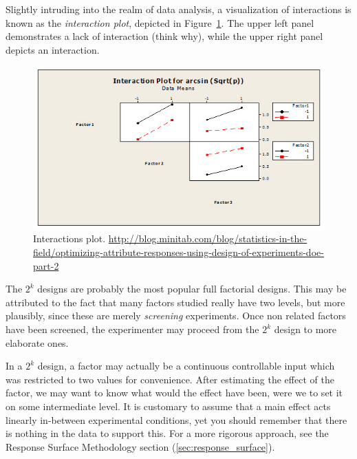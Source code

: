 
Slightly intruding into the realm of data analysis, a visualization of interactions is known as the \emph{interaction plot}, depicted in Figure~\ref{fig:interaction_plot}. 
The upper left panel demonstrates a lack of interaction (think why), while the upper right panel depicts an interaction.
\begin{figure}[ht]
\centering
\includegraphics[width=0.3\textheight]{art/attribute_doe_interaction_plot}
\caption[Interactions plot]{Interactions plot. \newline \url{http://blog.minitab.com/blog/statistics-in-the-field/optimizing-attribute-responses-using-design-of-experiments-doe-part-2}}
\label{fig:interaction_plot}
\end{figure}


\begin{remark}
The $2^k$ designs are probably the most popular full factorial designs. 
This may be attributed to the fact that many factors studied really have two levels, but more plausibly, since these are merely \emph{screening} experiments. 
Once non related factors have been screened, the experimenter may proceed from the $2^k$ design to more elaborate ones. 
\end{remark}



\begin{remark}
In a $2^k$ design, a factor may actually be a continuous controllable input which was restricted to two values for convenience. 
After estimating the effect of the factor, we may want to know what would the effect have been, were we to set it on some intermediate level.
It is customary to assume that a main effect acts linearly in-between experimental conditions, yet you should remember that there is nothing in the data to support this.
For a more rigorous approach, see the Response Surface Methodology section (\ref{sec:response_surface}).
\end{remark}


